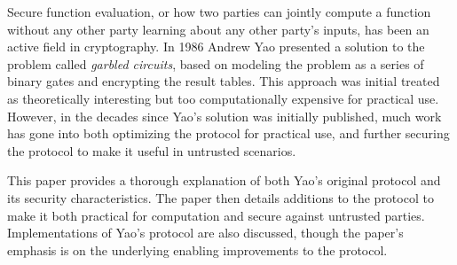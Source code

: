 Secure function evaluation, or how two parties can jointly compute a function without any other party learning about any other party's inputs, has been an active field in cryptography. In 1986 Andrew Yao presented a solution to the problem called \emph{garbled circuits}, based on modeling the problem as a series of binary gates and encrypting the result tables. This approach was initial treated as theoretically interesting but too computationally expensive for practical use.  However, in the decades since Yao's solution was initially published, much work has gone into both optimizing the protocol for practical use, and further securing the protocol to make it useful in untrusted scenarios.

This paper provides a thorough explanation of both Yao's original protocol and its security characteristics.  The paper then details additions to the protocol to make it both practical for computation and secure against untrusted parties.  Implementations of Yao's protocol are also discussed, though the paper's emphasis is on the underlying enabling improvements to the protocol.
